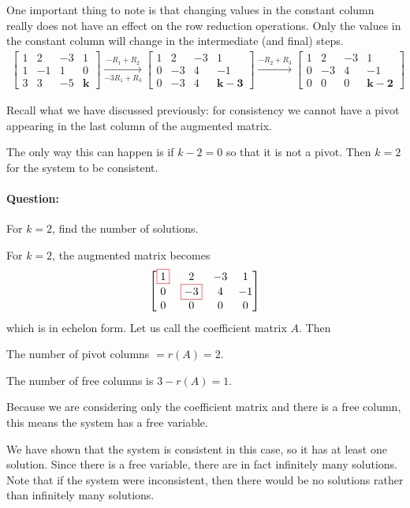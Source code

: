\documentclass[11pt]{article}
\newcommand{\ques}{\paragraph{Question:}}
\newcommand{\boxit}[2]{\textcolor{#1}{\boxed{\textcolor{black}{#2}}}}
\begin{document}
One important thing to note is that changing values in the constant column really does not have an effect on the row reduction operations. Only the values in the constant column will change in the intermediate (and final) steps.
\begin{align*}
\left[
\begin{matrix}
1 & 2 & -3 & 1
\\
1 & -1 & 1 & 0
\\
3 & 3 & -5 & \mathbf{k}
\end{matrix}
\right]
\xrightarrow[-3R_1 + R_3]{-R_1 + R_2}
\left[
\begin{matrix}
1 & 2 & -3 & 1
\\
0 & -3 & 4 & -1
\\
0 & -3 & 4 & \mathbf{k-3}
\end{matrix}
\right]
\xrightarrow[]{-R_2 + R_3}
\left[
\begin{matrix}
1 & 2 & -3 & 1
\\
0 & -3 & 4 & -1
\\
0 & 0 & 0 & \mathbf{k-2}
\end{matrix}
\right]
\end{align*}

Recall what we have discussed previously: for consistency we cannot have a pivot appearing in the last column of the augmented matrix.

The only way this can happen is if $k-2 = 0$ so that it is not a pivot. Then $k=2$ for the system to be consistent.

\ques For $k=2$, find the number of solutions.

For $k=2$, the augmented matrix becomes
\begin{align*}
\left[
\begin{matrix}
\boxit{red}{1} & 2 & -3 & 1
\\
0 & \boxit{red}{-3} & 4 & -1
\\
0 & 0 & 0 & 0
\end{matrix}
\right]
\end{align*}
which is in echelon form. Let us call the coefficient matrix $A$. Then

The number of pivot columns $ = r(A) = 2$.

The number of free columns is $3 - r(A) = 1$.

Because we are considering only the coefficient matrix and there is a free column, this means the system has a free variable.

We have shown that the system is consistent in this case, so it has at least one solution. Since there is a free variable, there are in fact infinitely many solutions. Note that if the system were inconsistent, then there would be no solutions rather than infinitely many solutions.
\end{document}
